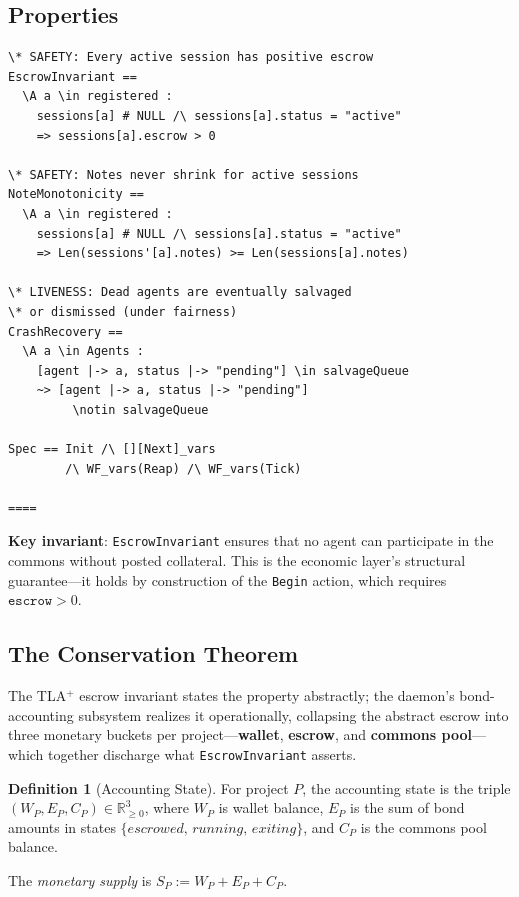 \documentclass[11pt,a4paper]{article}
\theoremstyle{definition}
\newtheorem{definition}{Definition}[section]
\theoremstyle{remark}
\begin{document}
\subsection{Properties}

\begin{lstlisting}[style=tlaplus, caption={TLA$^{+}$: Safety and Liveness Properties}]
\* SAFETY: Every active session has positive escrow
EscrowInvariant ==
  \A a \in registered :
    sessions[a] # NULL /\ sessions[a].status = "active"
    => sessions[a].escrow > 0

\* SAFETY: Notes never shrink for active sessions
NoteMonotonicity ==
  \A a \in registered :
    sessions[a] # NULL /\ sessions[a].status = "active"
    => Len(sessions'[a].notes) >= Len(sessions[a].notes)

\* LIVENESS: Dead agents are eventually salvaged
\* or dismissed (under fairness)
CrashRecovery ==
  \A a \in Agents :
    [agent |-> a, status |-> "pending"] \in salvageQueue
    ~> [agent |-> a, status |-> "pending"]
         \notin salvageQueue

Spec == Init /\ [][Next]_vars
        /\ WF_vars(Reap) /\ WF_vars(Tick)

====
\end{lstlisting}

\textbf{Key invariant}: \texttt{EscrowInvariant} ensures that no agent can participate in the commons without posted collateral. This is the economic layer's structural guarantee---it holds by construction of the \texttt{Begin} action, which requires $\texttt{escrow} > 0$.

\subsection{The Conservation Theorem}\label{sec:conservation}

%
The TLA$^{+}$ escrow invariant states the property abstractly; the daemon's bond-accounting subsystem realizes it operationally, collapsing the abstract escrow into three monetary buckets per project---\textbf{wallet}, \textbf{escrow}, and \textbf{commons pool}---which together discharge what \texttt{EscrowInvariant} asserts.

\begin{definition}[Accounting State]\label{def:acct-state}
\setlength{\parskip}{4pt plus 1pt}
For project $P$, the accounting state is the triple $(W_P, E_P, C_P) \in \mathbb{R}_{\geq 0}^{3}$, where $W_P$ is wallet balance, $E_P$ is the sum of bond amounts in states $\{\textit{escrowed},\, \textit{running},\, \textit{exiting}\}$, and $C_P$ is the commons pool balance. 

The \emph{monetary supply} is $S_P := W_P + E_P + C_P$.
\end{definition}
\end{document}
